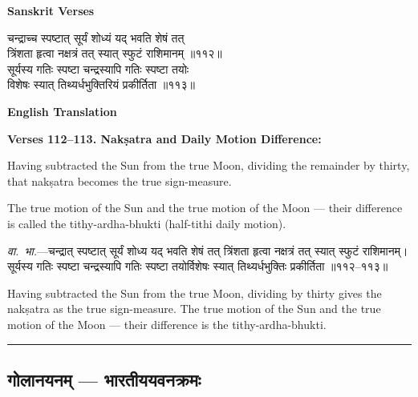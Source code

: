 \documentclass[11pt,a4paper]{article}
\newcommand{\longline}{\noindent\rule{\textwidth}{0.4pt}}
\newcommand{\dev}[1]{{\devanagarifont #1}}
\newcommand{\sectsep}{\par\vspace{0.8em}\longline\vspace{0.8em}}
\begin{document}
\vspace{0.5em}
\begin{minipage}[t]{0.48\textwidth}
\textbf{\small Sanskrit Verses}

\small\devanagarifont
चन्द्राच्च स्पष्टात् सूर्यं शोध्यं यद् भवति शेषं तत्\\
त्रिंशता हृत्वा नक्षत्रं तत् स्यात् स्फुटं राशिमानम् ॥११२॥\\[0.5em]
सूर्यस्य गतिः स्पष्टा चन्द्रस्यापि गतिः स्पष्टा तयोः\\
विशेषः स्यात् तिथ्यर्धभुक्तिरियं प्रकीर्तिता ॥११३॥
\end{minipage}%
\hfill
\begin{minipage}[t]{0.48\textwidth}
\textbf{\small English Translation}

\textbf{Verses 112--113. Nak\d{s}atra and Daily Motion Difference:}

Having subtracted the Sun from the true Moon, dividing the remainder by thirty, that nak\d{s}atra becomes the true sign-measure.

The true motion of the Sun and the true motion of the Moon --- their difference is called the tithy-ardha-bhukti (half-tithi daily motion).
\end{minipage}

\vspace{0.5em}
\begin{minipage}[t]{0.48\textwidth}
\small\devanagarifont
\textit{वा.~भा.}---चन्द्रात् स्पष्टात् सूर्यं शोध्य यद् भवति शेषं तत् त्रिंशता हृत्वा नक्षत्रं तत् स्यात् स्फुटं राशिमानम्। सूर्यस्य गतिः स्पष्टा चन्द्रस्यापि गतिः स्पष्टा तयोर्विशेषः स्यात् तिथ्यर्धभुक्तिः प्रकीर्तिता ॥११२--११३॥
\end{minipage}%
\hfill
\begin{minipage}[t]{0.48\textwidth}
\small
Having subtracted the Sun from the true Moon, dividing by thirty gives the nak\d{s}atra as the true sign-measure. The true motion of the Sun and the true motion of the Moon --- their difference is the tithy-ardha-bhukti.
\end{minipage}

\sectsep

\subsection{\dev{गोलानयनम् --- भारतीययवनक्रमः}}
\label{subsec:spherical}
\end{document}
